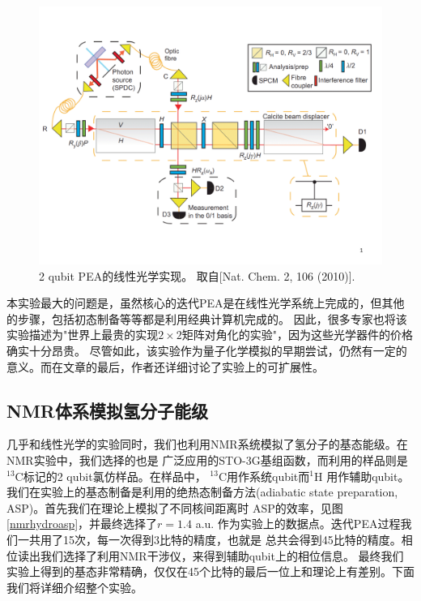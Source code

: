 \begin{figure}[htbp]
            \begin{center}
              \includegraphics[width= 0.8\columnwidth]{figures/opticnet.pdf}
              \caption{2 qubit PEA的线性光学实现。
              取自[Nat. Chem. 2, 106 (2010)\cite{optics_static}]. }\label{opticnet}
            \end{center}
 \end{figure}
本实验最大的问题是，虽然核心的迭代PEA是在线性光学系统上完成的，但其他的步骤，包括初态制备等等都是利用经典计算机完成的。
因此，很多专家也将该实验描述为"世界上最贵的实现$2\times2$矩阵对角化的实验"，因为这些光学器件的价格确实十分昂贵。
尽管如此，该实验作为量子化学模拟的早期尝试，仍然有一定的意义。而在文章的最后，作者还详细讨论了实验上的可扩展性。

\subsection{NMR体系模拟氢分子能级}

几乎和线性光学的实验同时，我们也利用NMR系统模拟了氢分子的基态能级\cite{static}。在NMR实验中，我们选择的也是
广泛应用的STO-3G基组函数，而利用的样品则是$^{13}$C标记的2 qubit氯仿样品。在样品中， $^{13}$C用作系统qubit而$^{1}$H
用作辅助qubit。我们在实验上的基态制备是利用的绝热态制备方法(adiabatic state preparation, ASP)。首先我们在理论上模拟了不同核间距离时
ASP的效率，见图\ref{nmrhydroasp}，并最终选择了$r=1.4$ a.u. 作为实验上的数据点。迭代PEA过程我们一共用了15次，每一次得到3比特的精度，也就是
总共会得到45比特的精度。相位读出我们选择了利用NMR干涉仪\cite{hydro2,hydro3,hydro4}，来得到辅助qubit上的相位信息。
最终我们实验上得到的基态非常精确，仅仅在45个比特的最后一位上和理论上有差别。下面我们将详细介绍整个实验。


